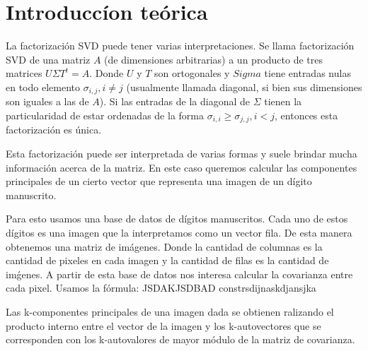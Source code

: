 \section{Introducc\'ion te\'orica}

\PARstart La factorizaci\'on SVD puede tener varias interpretaciones.
Se llama factorizaci\'on SVD de una matriz $A$ (de dimensiones arbitrarias)
a un producto de tres matrices $U\Sigma T^{t} = A$. Donde $U$ y $T$
son ortogonales y $Sigma$ tiene entradas nulas en todo elemento
$\sigma_{i,j}, i\neq j$ (usualmente llamada diagonal, si bien sus dimensiones
son iguales a las de $A$). Si las entradas de la diagonal de $\Sigma$ tienen
la particularidad de estar ordenadas de la forma $\sigma_{i,i} \geq
\sigma_{j,j}, i<j$, entonces esta factorizaci\'on es \'unica.

Esta factorizaci\'on puede ser interpretada de varias formas y suele
brindar mucha informaci\'on acerca de la matriz. En este caso queremos
calcular las componentes principales de un cierto vector que representa
una imagen de un d\'igito manuscrito.

Para esto usamos una base de datos de d\'igitos manuscritos.
Cada uno de estos d\'igitos es una imagen que la interpretamos como
un vector fila. De esta manera obtenemos una matriz de im\'agenes.
Donde la cantidad de columnas es la cantidad de pixeles en cada imagen
y la cantidad de filas es la cantidad de im\'genes.
A partir de esta base de datos nos interesa calcular la covarianza entre
cada pixel. Usamos la f\'ormula: JSDAKJSDBAD constrsdijnaskdjansjka

Las k-componentes principales de una imagen dada se obtienen ralizando
el producto interno entre el vector de la imagen y los k-autovectores
que se corresponden con los k-autovalores de mayor m\'odulo de la matriz
de covarianza.

